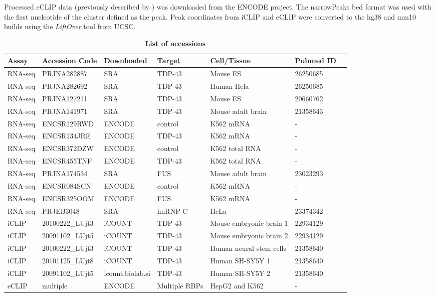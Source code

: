 Processed eCLIP data (previously described by \citep{Van_Nostrand2016-su}) was downloaded from the ENCODE project. The narrowPeaks bed format was used with the first nucleotide of the cluster defined as the peak. Peak coordinates from iCLIP and eCLIP were converted to the hg38 and mm10 builds using the \emph{LiftOver} tool from UCSC. 

\begin{table}[h!]
	\caption[List of accessions]{
		\textbf{List of accessions}
	}
	\label{table:cryptic_data}
	\begin{footnotesize}
		\begin{tabular}{lllllll}
			Assay & Accession Code & Downloaded & Target & Cell/Tissue & Pubmed ID\\
			\hline
			RNA-seq & PRJNA282887 & SRA\footnotemark & TDP-43 & Mouse ES  & 26250685 \\
			RNA-seq & PRJNA282692 & SRA & TDP-43 & Human Hela & 26250685 \\
			RNA-seq & PRJNA127211 & SRA & TDP-43 & Mouse ES & 20660762\\
			RNA-seq & PRJNA141971 & SRA & TDP-43 & Mouse adult brain & 21358643 \\
			RNA-seq & ENCSR129RWD & ENCODE\footnotemark & control & K562 mRNA & -\\
			RNA-seq & ENCSR134JRE & ENCODE & TDP-43 & K562 mRNA & -\\
			RNA-seq & ENCSR372DZW & ENCODE & control & K562 total RNA & -\\
			RNA-seq & ENCSR455TNF & ENCODE & TDP-43 & K562 total RNA & -\\
			RNA-seq & PRJNA174534 & SRA & FUS & Mouse adult brain & 23023293 \\
			RNA-seq & ENCSR084SCN & ENCODE & control & K562 mRNA & -\\
			RNA-seq & ENCSR325OOM & ENCODE & FUS & K562 mRNA & -\\
			RNA-seq & PRJEB3048 & SRA & hnRNP C & HeLa & 23374342 \\
			iCLIP & 20100222\_LUjt3 & iCOUNT\footnotemark & TDP-43 & Mouse embryonic brain 1 & 22934129\\
			iCLIP & 20091102\_LUjt5	& iCOUNT & TDP-43 & Mouse embryonic brain 2 & 22934129\\
			iCLIP & 20100222\_LUjt3 & iCOUNT & TDP-43 & Human neural stem cells & 21358640\\
			iCLIP & 20101125\_LUjt8 & iCOUNT & TDP-43 & Human SH-SY5Y 1 & 21358640\\
			iCLIP & 20091102\_LUjt5 & icount.biolab.si & TDP-43 & Human SH-SY5Y 2 & 21358640\\
			eCLIP & multiple & ENCODE & Multiple RBPs & HepG2 and K562 & -
		\end{tabular}
	\end{footnotesize}
	

\end{table}

